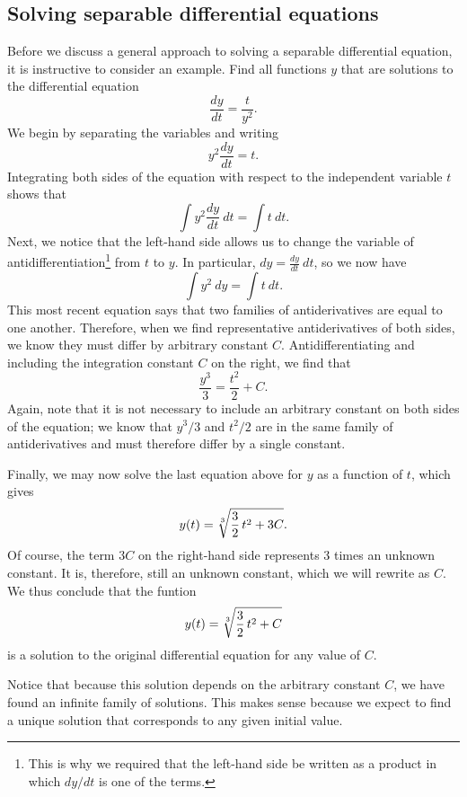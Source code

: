 

\subsection*{Solving separable differential equations} 

Before we discuss a general approach to solving a separable differential equation, it is instructive to consider an example.
\bex \label{Ex:7.4.1}
Find all functions $y$ that are solutions to the differential equation 
$$\frac{dy}{dt}= \frac{t}{y^2}.$$
\eex
We begin by separating the variables and writing
    $$
    y^2\frac{dy}{dt} = t.
    $$
Integrating both sides of the equation with respect to the independent
    variable $t$ shows that
    $$
    \int y^2\frac{dy}{dt}~dt = \int t~dt.
    $$
Next, we notice that the left-hand side allows us to change
    the variable of antidifferentiation\footnote{This is why we required that the left-hand side be written as a
    product in which $dy/dt$ is one of the terms.} from $t$ to $y$.  In
    particular,
    $dy = \frac{dy}{dt}~dt$, so we now have
    $$
    \int y^2 ~dy = \int t~dt.
    $$
   This most recent equation says that two families of antiderivatives are
    equal to one another.  Therefore, when we find representative
    antiderivatives of both sides, we know they must differ by
    arbitrary constant $C$.  Antidifferentiating and including the integration constant $C$ on the right, we find that
    $$
    \frac{y^3}{3} = \frac{t^2}{2} + C.
    $$
    Again, note that it is not necessary to include an arbitrary constant on both sides 
    of the equation;  we know that $y^3/3$ and $t^2/2$ are in the same
    family of antiderivatives and must therefore differ by a single
    constant.

Finally, we may now solve the last equation above for $y$ as a function of $t$, which gives
    $$
    y(t) = \sqrt[3]{\frac 32 \thinspace t^2 + 3C}.
    $$
    Of course, the term $3C$ on the right-hand side represents
    3 times an unknown constant.  It is, therefore, still an unknown
    constant, which we will rewrite as $C$.  We thus conclude that the funtion
    $$
    y(t) = \sqrt[3]{\frac 32 \thinspace t^2 + C}
    $$
is a solution to the original differential equation for any value of $C$.

Notice that because this solution depends on the arbitrary constant $C$, we have found an infinite family of
solutions.  This makes sense because we expect to find a unique solution that corresponds to any given
 initial value.

